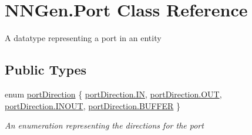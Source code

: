 \hypertarget{class_n_n_gen_1_1_port}{}\section{N\+N\+Gen.\+Port Class Reference}
\label{class_n_n_gen_1_1_port}


A datatype representing a port in an entity  


\subsection*{Public Types}
\begin{DoxyCompactItemize}
\item 
enum \hyperlink{class_n_n_gen_1_1_port_ac3b8f11a7a6bd6872e6954b64721d90c}{port\+Direction} \{ \hyperlink{class_n_n_gen_1_1_port_ac3b8f11a7a6bd6872e6954b64721d90cac86ee0d9d7ed3e7b4fdbf486fa6c0ebb}{port\+Direction.\+I\+N}, 
\hyperlink{class_n_n_gen_1_1_port_ac3b8f11a7a6bd6872e6954b64721d90caef373774188a51f80463f37b6bd9e83a}{port\+Direction.\+O\+U\+T}, 
\hyperlink{class_n_n_gen_1_1_port_ac3b8f11a7a6bd6872e6954b64721d90ca0c93f5d83bbb636236e9610d01e4f3cd}{port\+Direction.\+I\+N\+O\+U\+T}, 
\hyperlink{class_n_n_gen_1_1_port_ac3b8f11a7a6bd6872e6954b64721d90ca17de626bcae5109bb2f7a66dfc4a8a1d}{port\+Direction.\+B\+U\+F\+F\+E\+R}
 \}\begin{DoxyCompactList}\small\item\em An enumeration representing the directions for the port \end{DoxyCompactList}
\end{DoxyCompactItemize}
